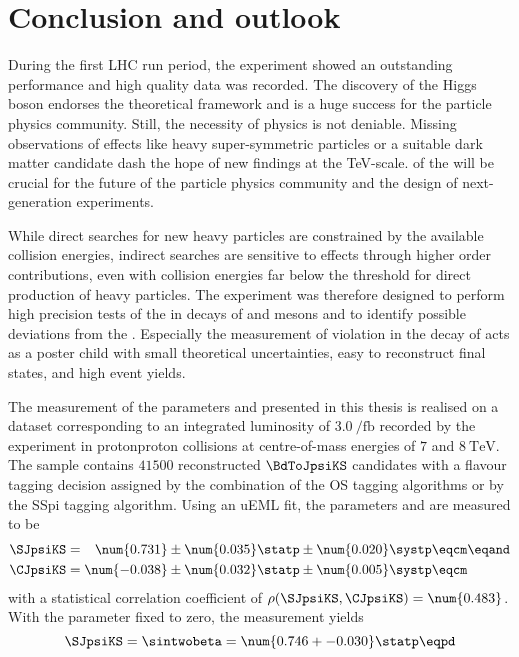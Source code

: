 
\chapter{Conclusion and outlook}
\label{ch:conclusion}

During the first \acs{LHC} run period, the \LHCb experiment showed an
outstanding performance and high quality data was recorded. The discovery of the
Higgs boson \cite{Aad:2015zhl} endorses the theoretical framework and is a huge
success for the particle physics community. Still, the necessity of \BSM physics
is not deniable. Missing observations of \BSM effects like heavy super-symmetric
particles or a suitable dark matter candidate dash the hope of new findings at
the \si{TeV}-scale.
\RunTwo of the \LHC will be crucial for the future of the particle physics
community and the design of next-generation experiments.

While direct searches for new heavy particles are constrained by the available
collision energies, indirect searches are sensitive to \BSM effects through
higher order contributions, even with collision energies far below the threshold
for direct production of heavy particles. The \LHCb experiment was therefore
designed to perform high precision tests of the \SM in decays of \B and \D
mesons and to identify possible deviations from the \SM. Especially the
measurement of \CP violation in the decay of \BdToJpsiKS acts as a poster child
with small theoretical uncertainties, easy to reconstruct final states, and high
event yields.

The measurement of the \CP parameters \SJpsiKS and \CJpsiKS presented in this
thesis is realised on a dataset corresponding to an integrated luminosity of
$\SI{3.0}{\per\femto\barn}$ recorded by the \LHCb experiment in
\acl{protonproton} collisions at centre-of-mass energies of $\num{7}$ and
$\SI{8}{\TeV}$. The sample contains $\num{41500}$ reconstructed $\BdToJpsiKS$
candidates with a flavour tagging decision assigned by the combination of the
\acl{OS} tagging algorithms or by the \acl{SSpi} tagging algorithm. Using an
\acl{uEML} fit, the \CP parameters \SJpsiKS and \CJpsiKS are measured to be
%
\begin{equation*}
  \begin{split}
    \SJpsiKS &= \phantom{-}\num{0.731} \pm \num{0.035} \statp \pm \num{0.020} \systp \eqcm\eqand \\
    \CJpsiKS &=           \num{-0.038} \pm \num{0.032} \statp \pm \num{0.005} \systp \eqcm
  \end{split}
\end{equation*}
%
with a statistical correlation coefficient of $\rho(\SJpsiKS,\CJpsiKS) =
\num{0.483}$. With the parameter \CJpsiKS fixed to zero, the measurement yields
%
\begin{equation*}
  \SJpsiKS = \sintwobeta = \num{0.746 +- 0.030}\statp \eqpd
\end{equation*}

